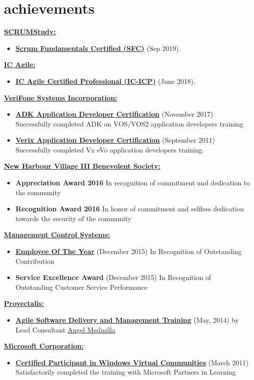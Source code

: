 \documentclass[]{friggeri-cvRS}
\begin{document}
\section{achievements}
\textbf{\underline{SCRUMStudy:}}
	\begin{itemize}
		\item \textbf{\href{https://www.scrumstudy.com/certification/certification-registry}{Scrum Fundamentals Certified (SFC)}} (Sep 2019).
	\end{itemize}
\textbf{\underline{IC Agile:}}
	\begin{itemize}
		\item \textbf{\href{https://icagile.com/Agile-Professionals/Find-Agile-Professionals/ctl/UserDetails/mid/938/uid/3df06156-d6ef-4f12-a4a2-b32dc5c41384}{IC Agile Certified Professional (IC-ICP)}} (June 2018).
	\end{itemize}
\textbf{\underline{VeriFone Systems Incorporation:}}
	\begin{itemize}
		\item \textbf{\href{https://www.verifonedevnet.com/verifone/devnet/dnHome.do}{ADK Application Developer Certification}} (November 2017) Successfully completed ADK on VOS/VOS2 application developers training
		\item \textbf{\href{https://www.verifonedevnet.com/verifone/devnet/dnHome.do}{Verix Application Developer Certification}} (September 2011) Successfully completed Vx eVo application developers training.
	\end{itemize}
\textbf{\underline{New Harbour Village III Benevolent Society:}}
	\begin{itemize}
		\item \textbf{Appreciation Award 2016} In recognition of commitment and dedication to the community
		\item \textbf{Recognition Award 2016} In honor of commitment and selfless dedication towards the security of the community
	\end{itemize}
\textbf{\underline{Management Control Systems:}}
	\begin{itemize}
		\item \textbf{\href{http://www.jamaicaobserver.com/news/MC-Systems-awards}{Employee Of The Year}} (December 2015) In Recognition of Outstanding Contribution
		\item \textbf{Service Excellence Award} (December 2015) In Recognition of Outstanding Customer Service Performance
	\end{itemize}
\textbf{\underline{Proyectalis:}}
	\begin{itemize}
		\item \textbf{\href{http://www.proyectalis.com/en/servicios/}{Agile Software Delivery and Management Training}} (May, 2014) by Lead Consultant \href{http://www.proyectalis.com/en/angelmedinilla/}{Angel Medinilla}
	\end{itemize}
\textbf{\underline{Microsoft Corporation:}}
	\begin{itemize}
		\item \textbf{\href{https://mva.microsoft.com/}{Certified Participant in Windows Virtual Communities}} (March 2011) Satisfactorily completed the training with Microsoft Partners in Learning
	\end{itemize}
\end{document}
